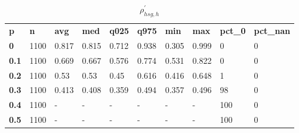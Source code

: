 \begin{table}[h]
 \centering 
\footnotesize
\caption{$\rho_{hsg,h}^\prime $}
\label{tab:alphahsgh}
\begin{tabular}[h]{| l l l l l l l l l l|
    } \hline
\textbf{ p} & \textbf{ n} & \textbf{ avg} & \textbf{ med} & \textbf{ q025} & \textbf{ q975} & \textbf{ min} & \textbf{ max} & \textbf{ pct\_0} & \textbf{ pct\_nan}
           \\
  \textbf{  0} & 1100 & 0.817 & 0.815 & 0.712 & 0.938 & 0.305 & 0.999 &   0 & 0
           \\
  \textbf{0.1} & 1100 & 0.669 & 0.667 & 0.576 & 0.774 & 0.531 & 0.822 &   0 & 0
           \\
  \textbf{0.2} & 1100 &  0.53 &  0.53 &  0.45 & 0.616 & 0.416 & 0.648 &   1 & 0
           \\
  \textbf{0.3} & 1100 & 0.413 & 0.408 & 0.359 & 0.494 & 0.357 & 0.496 &  98 & 0
           \\
  \textbf{0.4} & 1100 & - & - & - & - & - & - & 100 & 0
           \\
  \textbf{0.5} & 1100 & - & - & - & - & - & - & 100 & 0
           \\
 \hline \end{tabular}
 \end{table}

